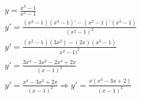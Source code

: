 \begin{ex}
\begin{align}
&y=\frac{x^3-1}{x^2-1}\nonumber\\
&y'=\frac{(x^2-1)(x^3-1)'-(x^2-1)'(x^3-1)}{(x^2-1)^2}\nonumber\\
&y'=\frac{(x^2-1)(3x^2)-(2x)(x^3-1)}{x^2-1)^2}\nonumber\\
&y'=\frac{3x^4-3x^2-2x^4+2x}{(x-1)^2}\nonumber\\
&y'=\frac{x^4-3x^2+2x}{(x-1)^2}\Rightarrow y'=\frac{x(x^3-3x+2)}{(x-1)^2}\nonumber
\end{align}
\end{ex}
